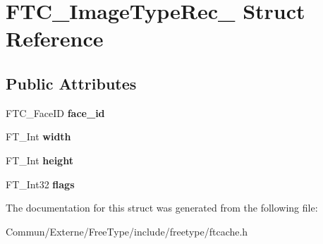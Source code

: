 \hypertarget{struct_f_t_c___image_type_rec__}{}\section{F\+T\+C\+\_\+\+Image\+Type\+Rec\+\_\+ Struct Reference}
\label{struct_f_t_c___image_type_rec__}
\subsection*{Public Attributes}
\begin{DoxyCompactItemize}
\item 
F\+T\+C\+\_\+\+Face\+ID {\bfseries face\+\_\+id}\hypertarget{struct_f_t_c___image_type_rec___a9851b8d4a06baacd18d5b9856fd85abd}{}\label{struct_f_t_c___image_type_rec___a9851b8d4a06baacd18d5b9856fd85abd}

\item 
F\+T\+\_\+\+Int {\bfseries width}\hypertarget{struct_f_t_c___image_type_rec___af1a4cccbabb0f5852ed755a12ed08dd8}{}\label{struct_f_t_c___image_type_rec___af1a4cccbabb0f5852ed755a12ed08dd8}

\item 
F\+T\+\_\+\+Int {\bfseries height}\hypertarget{struct_f_t_c___image_type_rec___adb56a9d18a3f522d713d0ba01c1a8778}{}\label{struct_f_t_c___image_type_rec___adb56a9d18a3f522d713d0ba01c1a8778}

\item 
F\+T\+\_\+\+Int32 {\bfseries flags}\hypertarget{struct_f_t_c___image_type_rec___a391782ed8c67de86591c71f276ea6454}{}\label{struct_f_t_c___image_type_rec___a391782ed8c67de86591c71f276ea6454}

\end{DoxyCompactItemize}


The documentation for this struct was generated from the following file\+:\begin{DoxyCompactItemize}
\item 
Commun/\+Externe/\+Free\+Type/include/freetype/ftcache.\+h\end{DoxyCompactItemize}
